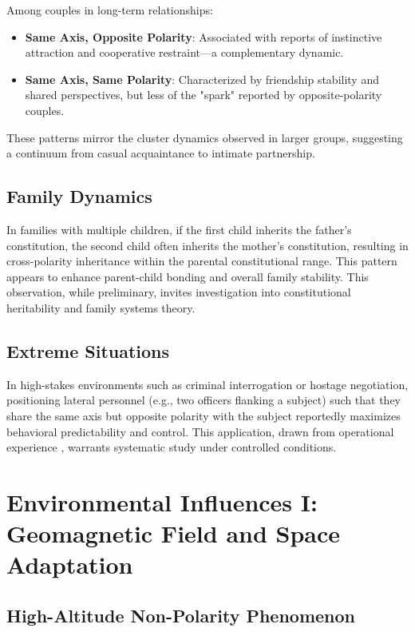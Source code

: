 \documentclass[12pt,a4paper]{article}
\begin{document}
Among couples in long-term relationships:

\begin{itemize}
    \item \textbf{Same Axis, Opposite Polarity}: Associated with reports of instinctive attraction and cooperative restraint—a complementary dynamic.
    \item \textbf{Same Axis, Same Polarity}: Characterized by friendship stability and shared perspectives, but less of the "spark" reported by opposite-polarity couples.
\end{itemize}

These patterns mirror the cluster dynamics observed in larger groups, suggesting a continuum from casual acquaintance to intimate partnership.

\subsection{Family Dynamics}

In families with multiple children, if the first child inherits the father's constitution, the second child often inherits the mother's constitution, resulting in cross-polarity inheritance within the parental constitutional range. This pattern appears to enhance parent-child bonding and overall family stability. This observation, while preliminary, invites investigation into constitutional heritability and family systems theory.

\subsection{Extreme Situations}

In high-stakes environments such as criminal interrogation or hostage negotiation, positioning lateral personnel (e.g., two officers flanking a subject) such that they share the same axis but opposite polarity with the subject reportedly maximizes behavioral predictability and control. This application, drawn from operational experience \cite{yoon2026_300}, warrants systematic study under controlled conditions.

\section{Environmental Influences I: Geomagnetic Field and Space Adaptation}

\subsection{High-Altitude Non-Polarity Phenomenon}
\end{document}

